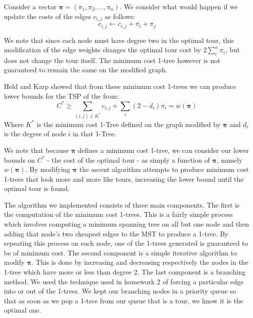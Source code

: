 \documentclass[11pt]{article}
\newcommand{\ve}[1]{\boldsymbol{#1}}
\begin{document}
	Consider a vector $\ve{\pi} = (\pi_1, \pi_2, \dots, \pi_n)$. We consider what would happen if we update the costs of the edges $c_{i,j}$ as follows:
	$$ c_{i,j} \leftarrow c_{i,j} + \pi_i + \pi_j $$
	
	We note that since each node must have degree two in the optimal tour, this modification of the edge weights changes the optimal tour cost by $2 \sum\limits_i^n \pi_i$, but does not change the tour itself. The minimum cost 1-tree however is not guaranteed to remain the same on the modified graph.
	
	Held and Karp showed that from these minimum cost 1-trees we can produce lower bounds for the TSP of the from:
	\[ C^* \geq \sum\limits_{(i,j) \in K^*} c_{i,j} + \sum\limits_i (2 - d_i)\pi_i = w(\ve{\pi}) \]
	Where $K^*$ is the minimum cost 1-Tree defined on the graph modified by $\ve{\pi}$ and $d_i$ is the degree of node $i$ in that 1-Tree. 
	
	We note that because $\ve{\pi}$ defines a minimum cost 1-tree, we can consider our lower bounds on $C^*$ - the cost of the optimal tour - as simply a function of $\ve{\pi}$, namely $w(\ve{\pi})$. By modifying $\ve{\pi}$ the ascent algorithm attempts to produce minimum cost 1-trees that look more and more like tours, increasing the lower bound until the optimal tour is found.
	
	The algorithm we implemented consists of three main components. The first is the computation of the minimum cost 1-trees. This is a fairly simple process which involves computing a minimum spanning tree on all but one node and then adding that node's two cheapest edges to the MST to produce a 1-tree. By repeating this process on each node, one of the 1-trees generated is guaranteed to be of minimum cost. The second component is a simple iterative algorithm to modify $\ve{\pi}$. This is done by increasing and decreasing respectively the nodes in the 1-tree which have more or less than degree 2. The last component is a branching method. We used the technique used in homework 2 of forcing a particular edge into or out of the 1-trees. We kept our branching nodes in a priority queue so that as soon as we pop a 1-tree from our queue that is a tour, we know it is the optimal one.
	
\end{document}
